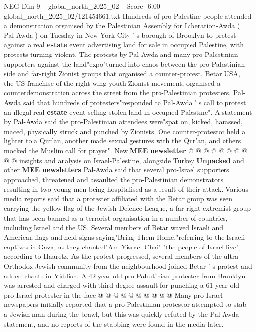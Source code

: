 \begin{textsample}{NEG Dim 9 – global\_north\_2025\_02 – Score -6.00 – global\_north\_2025\_02/121454661.txt}  \label{ex:f9_neg_014}
Hundreds of pro-Palestine people attended a demonstration organised by the Palestinian Assembly for Liberation-Awda ( Pal-Awda ) on Tuesday in New York City ' s borough of Brooklyn to protest against a real \textbf{estate} event advertising land for sale in occupied Palestine, with protests turning violent.
The protests by Pal-Awda and many pro-Palestinian supporters against the land"expo"turned into chaos between the pro-Palestinian side and far-right Zionist groups that organised a counter-protest.
Betar USA, the US franchise of the right-wing youth Zionist movement, organised a counterdemonstration across the street from the pro-Palestinian protesters.
Pal-Awda said that hundreds of protesters"responded to Pal-Awda ' s call to protest an illegal real \textbf{estate} event selling stolen land in occupied Palestine".
A statement by Pal-Awda said the pro-Palestinian attendees were"spat on, kicked, harassed, maced, physically struck and punched by Zionists.
One counter-protestor held a lighter to a Qur'an, another made sexual gestures with the Qur'an, and others mocked the Muslim call for prayer".
New \textbf{MEE} \textbf{newsletter} @ @ @ @ @ @ @ @ @ @ insights and analysis on Israel-Palestine, alongside Turkey \textbf{Unpacked} and other \textbf{MEE} \textbf{newsletters} Pal-Awda said that several pro-Israel supporters approached, threatened and assaulted the pro-Palestinian demonstrators, resulting in two young men being hospitalised as a result of their attack.
Various media reports said that a protester affiliated with the Betar group was seen carrying the yellow flag of the Jewish Defence League, a far-right extremist group that has been banned as a terrorist organisation in a number of countries, including Israel and the US.
Several members of Betar waved Israeli and American flags and held signs saying"Bring Them Home,"referring to the Israeli captives in Gaza, as they chanted"Am Yisrael Chai"-"the people of Israel live", according to Haaretz.
As the protest progressed, several members of the ultra-Orthodox Jewish community from the neighbourhood joined Betar ' s protest and added chants in Yiddish.
A 42-year-old pro-Palestinian protester from Brooklyn was arrested and charged with third-degree assault for punching a 61-year-old pro-Israel protester in the face @ @ @ @ @ @ @ @ @ @ Many pro-Israel newspapers initially reported that a pro-Palestinian protestor attempted to stab a Jewish man during the brawl, but this was quickly refuted by the Pal-Awda statement, and no reports of the stabbing were found in the media later.

\end{textsample}

